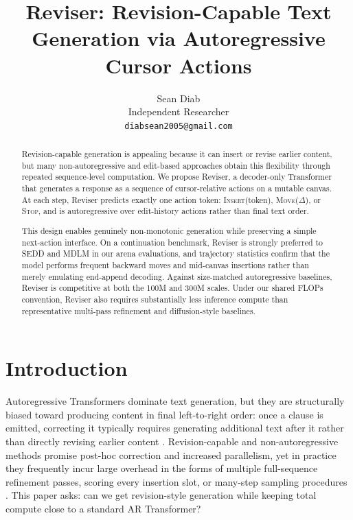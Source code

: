 \documentclass[11pt]{article}
\title{Reviser: Revision-Capable Text Generation via Autoregressive Cursor Actions}
\author{
Sean Diab\\
Independent Researcher\\
\texttt{diabsean2005@gmail.com}
}
\DeclareRobustCommand{\Stop}{\ifmmode\text{\textsc{Stop}}\else\textsc{Stop}\fi}
\DeclareRobustCommand{\Insert}{\ifmmode\text{\textsc{Insert}}\else\textsc{Insert}\fi}
\DeclareRobustCommand{\Move}{\ifmmode\text{\textsc{Move}}\else\textsc{Move}\fi}
\begin{document}
\maketitle
\thispagestyle{firstpage}

\begin{abstract}
Revision-capable generation is appealing because it can insert or revise earlier content, but many non-autoregressive and edit-based approaches obtain this flexibility through repeated sequence-level computation. We propose Reviser, a decoder-only Transformer that generates a response as a sequence of cursor-relative actions on a mutable canvas. At each step, Reviser predicts exactly one action token: \Insert(token), \Move($\Delta$), or \Stop, and is autoregressive over edit-history actions rather than final text order.

This design enables genuinely non-monotonic generation while preserving a simple next-action interface. On a continuation benchmark, Reviser is strongly preferred to SEDD and MDLM in our arena evaluations, and trajectory statistics confirm that the model performs frequent backward moves and mid-canvas insertions rather than merely emulating end-append decoding. Against size-matched autoregressive baselines, Reviser is competitive at both the 100M and 300M scales. Under our shared FLOPs convention, Reviser also requires substantially less inference compute than representative multi-pass refinement and diffusion-style baselines.
\end{abstract}

\section{Introduction}
\label{sec:intro}

Autoregressive Transformers dominate text generation, but they are structurally biased toward producing content in final left-to-right order: once a clause is emitted, correcting it typically requires generating additional text after it rather than directly revising earlier content \citep{vaswani2017attention,brown2020language}. Revision-capable and non-autoregressive methods promise post-hoc correction and increased parallelism, yet in practice they frequently incur large overhead in the forms of multiple full-sequence refinement passes, scoring every insertion slot, or many-step sampling procedures \citep{ghazvininejad2019maskpredict,gu2019levenshtein,li2022diffusionlm,lou2024sedd,sahoo2024mdlm}. This paper asks: can we get revision-style generation while keeping total compute close to a standard AR Transformer?
\end{document}
